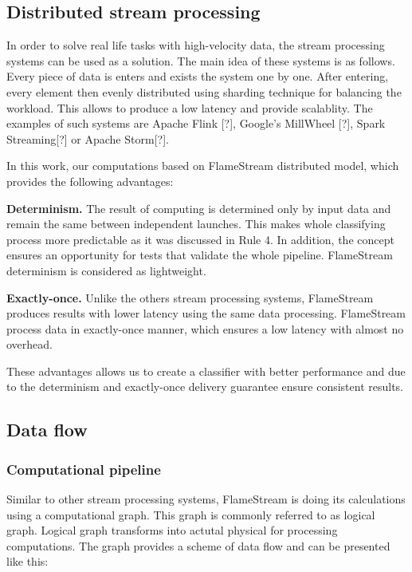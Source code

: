 
\subsection{Distributed stream processing}

In order to solve real life tasks with high-velocity data, the stream processing systems can be used as a solution. The main idea of these systems is as follows. Every piece of data is enters and exists the system one by one. After entering, every element then evenly distributed using sharding technique for balancing the workload. This allows to produce a low latency and provide scalablity. The examples of such systems are Apache Flink [?], Google's MillWheel [?], Spark Streaming[?] or Apache Storm[?].

In this work, our computations based on FlameStream \cite{kuralenok2018flamestream} distributed model, which provides the following advantages:

\textbf{Determinism.} The result of computing is determined only by input data and remain the same between independent launches. This makes whole classifying process more predictable as it was discussed in \cite{stonebraker20058} Rule 4. In addition, the concept ensures an opportunity for tests that validate the whole pipeline. FlameStream determinism is considered as lightweight.

\textbf{Exactly-once.} Unlike the others stream processing systems, FlameStream produces results with lower latency using the same data processing. FlameStream process data in exactly-once manner, which ensures a low latency with almost no overhead.

These advantages allows us to create a classifier with better performance and due to the determinism and exactly-once delivery guarantee ensure consistent results.

\subsection{Data flow}

\subsubsection{Computational pipeline}

Similar to other stream processing systems, FlameStream is doing its calculations using a computational graph. This graph is  commonly referred to as logical graph. Logical graph transforms into actutal physical for processing computations. The graph provides a scheme of data flow and can be presented like this:

